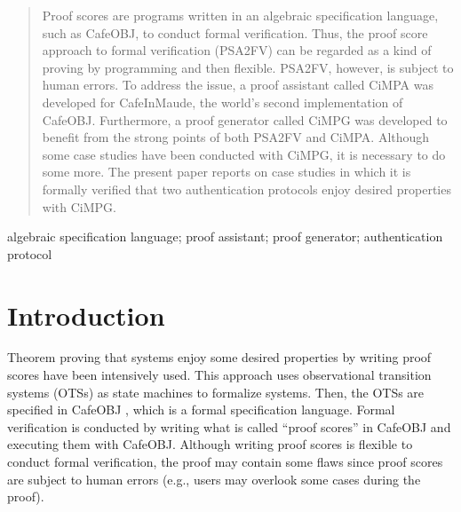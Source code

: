 \documentclass[10pt, conference, compsocconf]{IEEEtran}
\begin{document}
	\begin{abstract}
		Proof scores are programs written in an algebraic specification language, such as CafeOBJ, to conduct formal verification. Thus, the proof score approach to formal verification (PSA2FV) can be regarded as a kind of proving by programming and then flexible. PSA2FV, however, is subject to human errors. To address the issue, a proof assistant called CiMPA was developed for CafeInMaude, the world’s second implementation of CafeOBJ. Furthermore, a proof generator called CiMPG was developed to benefit from the strong points of both PSA2FV and CiMPA. Although some case studies have been conducted with CiMPG, it is necessary to do some more. The present paper reports on case studies in which it is formally verified that two authentication protocols enjoy desired properties with CiMPG.
	\end{abstract}
	
	\begin{IEEEkeywords}
		algebraic specification language; proof assistant; proof generator; authentication protocol
		
	\end{IEEEkeywords}
	
	
	\IEEEpeerreviewmaketitle
	
	\section{Introduction}
	Theorem proving that systems enjoy some desired properties by writing proof scores have been intensively used.
	This approach uses observational transition systems (OTSs) \cite{OgataF03fmoods} as state machines to formalize systems. 
	Then, the OTSs are specified in CafeOBJ \cite{DiaconescuF98amast}, which is a formal specification language. 
	Formal verification is conducted by writing what is called ``proof scores'' \cite{OgataF03fmoods} in CafeOBJ and executing them with CafeOBJ. 
	Although writing proof scores is flexible to conduct formal verification, the proof may contain some flaws since proof scores are subject to human errors (e.g., users may overlook some cases during the proof).
	
\end{document}
